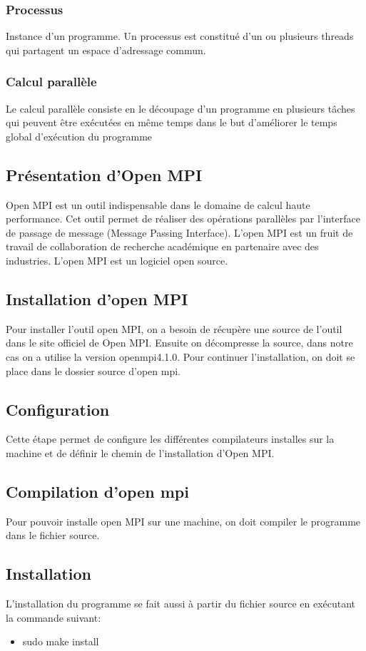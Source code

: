 \documentclass[11pt]{article}
\begin{document}
\subsubsection{Processus}
\label{sec:org823e0f7}
Instance d’un programme. Un processus est constitué d’un ou plusieurs threads qui partagent un espace d’adressage commun.
\subsubsection{Calcul parallèle}
\label{sec:org32fbeed}
Le calcul parallèle consiste en le découpage d’un programme en plusieurs tâches qui peuvent être exécutées en même temps dans le but d’améliorer le temps global d’exécution du programme
\subsection{Présentation d'Open MPI}
\label{sec:org5c4e16c}
Open MPI est un outil indispensable dans le domaine de calcul haute performance.
Cet outil permet de réaliser des opérations parallèles par l'interface de passage de message (Message Passing Interface).
L'open MPI est un fruit de travail de collaboration de recherche académique en partenaire avec des industries. L'open MPI est un logiciel open source.
\subsection{Installation d'open MPI}
\label{sec:orgd843bc6}
Pour installer l'outil open MPI, on a besoin de récupère une source de l'outil dans le site officiel de Open MPI. Ensuite on décompresse la source, dans notre cas on a utilise la version openmpi4.1.0.
Pour continuer l'installation, on doit se place dans le dossier source d'open mpi.
\subsection{Configuration}
\label{sec:orgad5bd49}
Cette étape permet de configure les différentes compilateurs installes sur la machine et de définir le chemin de l'installation d'Open MPI.
\subsection{Compilation d'open mpi}
\label{sec:org13bab62}
Pour pouvoir installe open MPI sur une machine, on doit compiler le programme dans le fichier source.
\subsection{Installation}
\label{sec:org7cd6e2d}
L'installation du programme se fait aussi à partir du fichier source en exécutant la commande suivant:
\begin{itemize}
\item sudo make install
\end{itemize}
\end{document}
